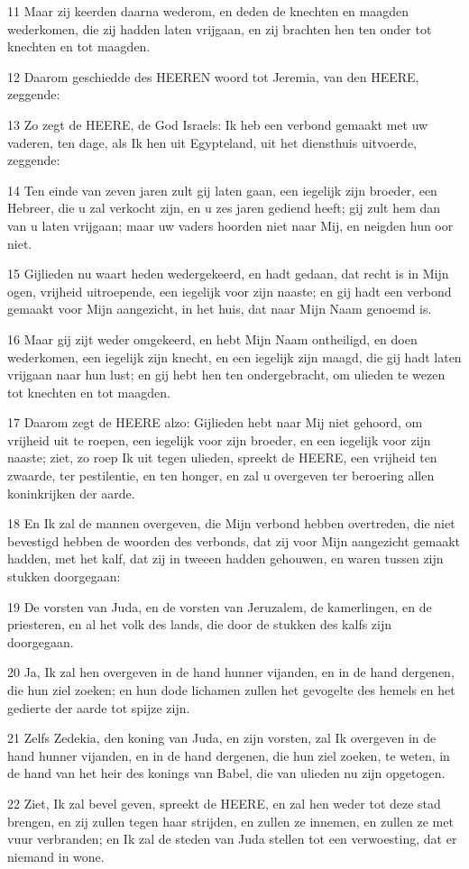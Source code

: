 \par 11 Maar zij keerden daarna wederom, en deden de knechten en maagden wederkomen, die zij hadden laten vrijgaan, en zij brachten hen ten onder tot knechten en tot maagden.
\par 12 Daarom geschiedde des HEEREN woord tot Jeremia, van den HEERE, zeggende:
\par 13 Zo zegt de HEERE, de God Israels: Ik heb een verbond gemaakt met uw vaderen, ten dage, als Ik hen uit Egypteland, uit het diensthuis uitvoerde, zeggende:
\par 14 Ten einde van zeven jaren zult gij laten gaan, een iegelijk zijn broeder, een Hebreer, die u zal verkocht zijn, en u zes jaren gediend heeft; gij zult hem dan van u laten vrijgaan; maar uw vaders hoorden niet naar Mij, en neigden hun oor niet.
\par 15 Gijlieden nu waart heden wedergekeerd, en hadt gedaan, dat recht is in Mijn ogen, vrijheid uitroepende, een iegelijk voor zijn naaste; en gij hadt een verbond gemaakt voor Mijn aangezicht, in het huis, dat naar Mijn Naam genoemd is.
\par 16 Maar gij zijt weder omgekeerd, en hebt Mijn Naam ontheiligd, en doen wederkomen, een iegelijk zijn knecht, en een iegelijk zijn maagd, die gij hadt laten vrijgaan naar hun lust; en gij hebt hen ten ondergebracht, om ulieden te wezen tot knechten en tot maagden.
\par 17 Daarom zegt de HEERE alzo: Gijlieden hebt naar Mij niet gehoord, om vrijheid uit te roepen, een iegelijk voor zijn broeder, en een iegelijk voor zijn naaste; ziet, zo roep Ik uit tegen ulieden, spreekt de HEERE, een vrijheid ten zwaarde, ter pestilentie, en ten honger, en zal u overgeven ter beroering allen koninkrijken der aarde.
\par 18 En Ik zal de mannen overgeven, die Mijn verbond hebben overtreden, die niet bevestigd hebben de woorden des verbonds, dat zij voor Mijn aangezicht gemaakt hadden, met het kalf, dat zij in tweeen hadden gehouwen, en waren tussen zijn stukken doorgegaan:
\par 19 De vorsten van Juda, en de vorsten van Jeruzalem, de kamerlingen, en de priesteren, en al het volk des lands, die door de stukken des kalfs zijn doorgegaan.
\par 20 Ja, Ik zal hen overgeven in de hand hunner vijanden, en in de hand dergenen, die hun ziel zoeken; en hun dode lichamen zullen het gevogelte des hemels en het gedierte der aarde tot spijze zijn.
\par 21 Zelfs Zedekia, den koning van Juda, en zijn vorsten, zal Ik overgeven in de hand hunner vijanden, en in de hand dergenen, die hun ziel zoeken, te weten, in de hand van het heir des konings van Babel, die van ulieden nu zijn opgetogen.
\par 22 Ziet, Ik zal bevel geven, spreekt de HEERE, en zal hen weder tot deze stad brengen, en zij zullen tegen haar strijden, en zullen ze innemen, en zullen ze met vuur verbranden; en Ik zal de steden van Juda stellen tot een verwoesting, dat er niemand in wone.

